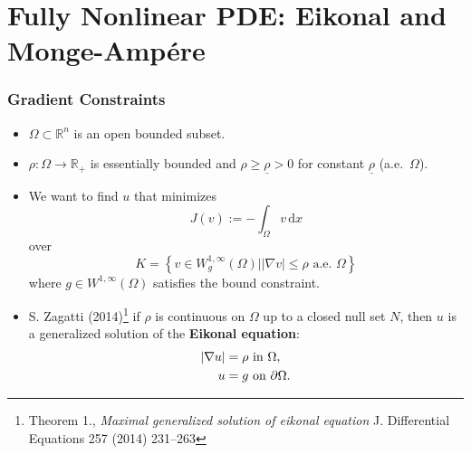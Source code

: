 \documentclass[aspectratio=169,xcolor=dvipsnames,11pt]{beamer}
\begin{document}
\section{Fully Nonlinear PDE: Eikonal and Monge-Amp\'ere}
\begin{frame}\frametitle{Gradient Constraints}
\begin{itemize}
\item  $\Omega \subset \mathbb R^n$ is an open bounded subset.
\item  $\rho : \Omega \to \mathbb R_+$ is essentially bounded and $\rho \ge \underline{\rho} > 0$ for constant $\underline{\rho}$ (a.e.\ $\Omega$).
\item We want to find $u$  that  minimizes 
\[
J(v) := -\int_{\Omega} v \, \mathrm{d} x 
\] 
over
\[
K = \left\{
v \in W^{1,\infty}_g(\Omega) \left| | \nabla v | \le \rho \text{ a.e. } \Omega \right.
\right\}
\] 
where $g \in W^{1,\infty}(\Omega)$ satisfies the bound constraint. \pause
\item S. Zagatti (2014)\footnote{\tiny Theorem 1., \textit{Maximal generalized solution of eikonal equation}  J. Differential Equations 257 (2014) 231–263 } if $\rho$ is continuous on $\Omega$ up to a closed null set $N$, then $u$ is a generalized solution of the \textbf{Eikonal equation}:
\begin{equation}\label{eq:eik}
\aligned
|\nabla u| &= \rho \text{ in } \Omega,\\
u &= g \text{ on } \partial \Omega.
\endaligned
\end{equation}
\end{itemize}
\end{frame}
\end{document}
